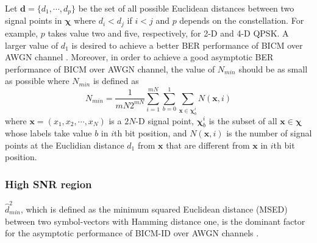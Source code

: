 \documentclass[12pt, draftclsnofoot, onecolumn]{IEEEtran}
\newcommand{\mb}[1]{\boldsymbol{#1}}
\begin{document}
Let ${\mb d} = \lbrace d_{1}, \cdots, d_{p}\rbrace$ be the set of all possible Euclidean distances between two signal points in $\mb{\chi}$ where $d_{i}<d_{j}$ if ${i}< {j}$ and $p$ depends on the constellation. For example, $p$ takes value  two and five, respectively,   for  2-{D} and 4-D QPSK. A larger  value of $d_{1}$ is desired to achieve a better BER performance of BICM over AWGN channel  \cite{BICM}.  Moreover, in order to achieve  a good asymptotic BER performance of  BICM  over AWGN channel, the value of $N_{min}$ should be as small as possible \cite{BICM} where  $N_{min}$ is defined as
\begin{equation}
N_{min} = \dfrac{1}{mN2^{mN}}\sum_{i=1}^{mN}\sum_{b=0}^{1} \sum_{{\mb x}\in \mb{\chi}_{b}^{i}}  N({\mb x},i)
\label{Nmin}
\end{equation}  where   $\mb{x} = (x_{1}, x_{2}, \cdots, x_{N})$ is a $2N$-D signal point, $\mb{\chi}_{b}^{i}$ is the subset of all $\mb{x} \in \mb{\chi}$ whose labels take value $b$ in $i$th bit position,  and \color{black} $N({\mb x},i)$ is the number of signal points at the Euclidian \color{black}  distance $d_{1}$ from ${\mb x}$ that are different from ${\mb x}$ in  $i$th bit position.

\subsubsection{High SNR region}
 $\hat{d}_{min}^{2}$, which is defined as the minimum squared Euclidean distance (MSED) between two symbol-vectors with Hamming distance one,  is the dominant factor for the asymptotic performance of BICM-ID over AWGN channels \cite{Chindapol_16QAM}. \color{black}
\end{document}
